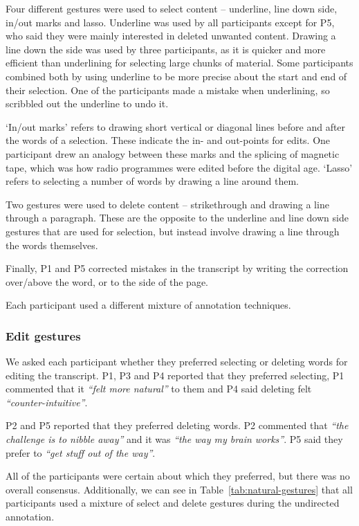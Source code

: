 Four different gestures were used to select content -- underline, line down side, in/out marks and lasso.  Underline
was used by all participants except for P5, who said they were mainly interested in deleted unwanted content.  Drawing
a line down the side was used by three participants, as it is quicker and more efficient than underlining for selecting
large chunks of material.  Some participants combined both by using underline to be more precise about the start and
end of their selection.  One of the participants made a mistake when underlining, so scribbled out the underline to
undo it.

`In/out marks' refers to drawing short vertical or diagonal lines before and after the words of a selection. These
indicate the in- and out-points for edits. One participant drew an analogy between these marks and the splicing of
magnetic tape, which was how radio programmes were edited before the digital age. `Lasso' refers to selecting a number
of words by drawing a line around them.

Two gestures were used to delete content -- strikethrough and drawing a line through a paragraph. These are the
opposite to the underline and line down side gestures that are used for selection, but instead involve drawing a line
through the words themselves.

Finally, P1 and P5 corrected mistakes in the transcript by writing the correction over/above the
word, or to the side of the page.

Each participant used a different mixture of annotation techniques.

\subsubsection{Edit gestures}\label{sec:paper-proto-edit-gestures}
We asked each participant whether they preferred selecting or deleting words for editing the transcript.  P1, P3 and P4
reported that they preferred selecting, P1 commented that it \textit{``felt more natural''} to them and P4 said
deleting felt \textit{``counter-intuitive''}.

P2 and P5 reported that they preferred deleting words. P2 commented that \textit{``the challenge is to nibble away''}
and it was \textit{``the way my brain works''}. P5 said they prefer to \textit{``get stuff out of the way''}.

All of the participants were certain about which they preferred, but there was no overall consensus. Additionally, we
can see in Table~\ref{tab:natural-gestures} that all participants used a mixture of select and delete gestures during
the undirected annotation.

